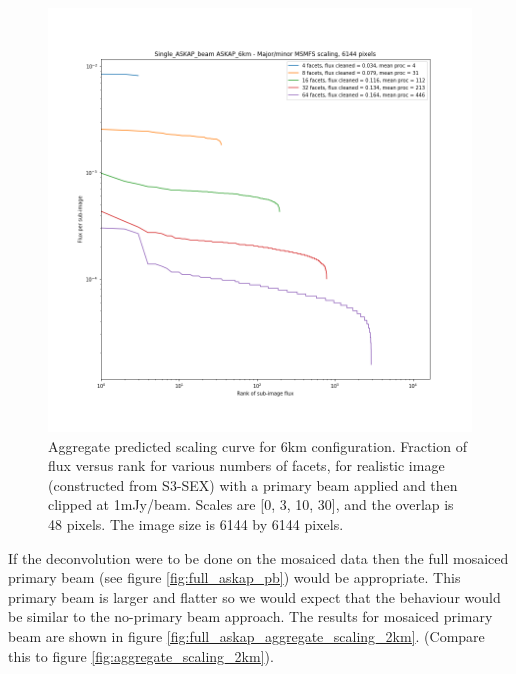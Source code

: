 \documentclass[11pt,a4paper,variablewidth]{article}
\begin{document}
\begin{figure}[H]
  \centering
  \includegraphics[width=\textwidth]{./pngs/aggregate_scaling_single_ASKAP_beam_ASKAP_6km_6144.png}
  \caption{Aggregate predicted scaling curve for 6km configuration. Fraction of flux versus rank for various numbers of facets, for realistic image (constructed from S3-SEX) with a primary beam applied and then clipped at 1mJy/beam. Scales are [0, 3, 10, 30], and the overlap is 48 pixels. The image size is 6144 by 6144 pixels.}
  \label{fig:aggregate_scaling_6km}
\end{figure}

If the deconvolution were to be done on the mosaiced data then the full mosaiced primary beam (see figure \ref{fig:full_askap_pb}) would be appropriate. This primary beam is larger and flatter so we would expect that the behaviour would be similar to the no-primary beam approach. The results for mosaiced primary beam are shown in figure \ref{fig:full_askap_aggregate_scaling_2km}. (Compare this to figure \ref{fig:aggregate_scaling_2km}).
\end{document}
